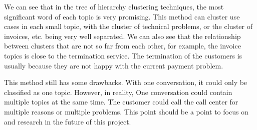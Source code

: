 We can see that in the tree of hierarchy clustering techniques, the most significant word of each topic is very promising. This method can cluster use cases in each small topic, with the cluster of technical problems, or the cluster of invoices, etc. being very well separated. We can also see that the relationship between clusters that are not so far from each other, for example, the invoice topics is close to the termination service. The termination of the customers is usually because they are not happy with the current payment problem.

This method still has some drawbacks. With one conversation, it could only be classified as one topic. However, in reality, One conversation could contain multiple topics at the same time. The customer could call the call center for multiple reasons or multiple problems. This point should be a point to focus on and research in the future of this project.